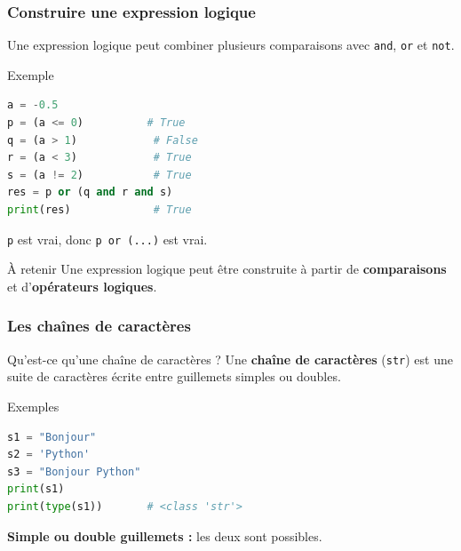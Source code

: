 \documentclass[10pt]{beamer}
\begin{document}
\begin{frame}[containsverbatim]
\frametitle{Construire une expression logique}

Une expression logique peut combiner plusieurs comparaisons
avec \texttt{and}, \texttt{or} et \texttt{not}.

\vspace{0.2cm}

\begin{exampleblock}{Exemple}
\begin{lstlisting}[language=Python]
a = -0.5
p = (a <= 0)          # True
q = (a > 1)            # False
r = (a < 3)            # True
s = (a != 2)           # True
res = p or (q and r and s)
print(res)             # True
\end{lstlisting}
\end{exampleblock}

\vspace{0.15cm}

\begin{center}
\texttt{p} est vrai, donc \texttt{p or (...)} est vrai.
\end{center}

\vspace{0.1cm}

\begin{alertblock}{À retenir}
Une expression logique peut être construite à partir de
\textbf{comparaisons} et d'\textbf{opérateurs logiques}.
\end{alertblock}

\end{frame}

\begin{frame}[containsverbatim]
\frametitle{Les chaînes de caractères}

\begin{block}{Qu'est-ce qu'une chaîne de caractères ?}
Une \textbf{chaîne de caractères} (\texttt{str}) est une suite de caractères
écrite entre guillemets simples ou doubles.
\end{block}

\vspace{0.2cm}

\begin{exampleblock}{Exemples}
\begin{lstlisting}[language=Python]
s1 = "Bonjour"
s2 = 'Python'
s3 = "Bonjour Python"
print(s1)
print(type(s1))       # <class 'str'>
\end{lstlisting}
\end{exampleblock}

\vspace{0.1cm}

\begin{center}
\textbf{Simple ou double guillemets :} les deux sont possibles.
\end{center}

\end{frame}
\end{document}
